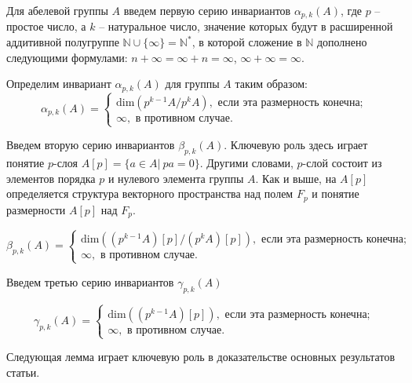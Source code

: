 \documentclass[a4paper,11pt,twoside]{article}
\def\N{{\mathbb{N}}}
\begin{document}
Для абелевой группы $A$ введем первую серию инвариантов $\alpha_{p,k}(A)$, где $p$ -- простое число, а $k$ -- натуральное число, значение которых будут в расширенной аддитивной полугруппе $\N \cup \{\infty \} = \N^*$, в которой сложение в $\N$ дополнено следующими формулами: $n + \infty = \infty + n = \infty$, $\infty + \infty = \infty$.

Определим инвариант $\alpha_{p,k}(A)$ для группы $A$ таким образом:
$$\alpha_{p,k}(A) = \left\lbrace 
\begin{array}{l}  
\mathrm{dim} \left( p^{k-1}A \Big/ p^k A \right), \text{ если эта размерность конечна;} \\ 
\infty, \text{ в противном случае.}
\end{array} 
\right.$$

Введем вторую серию инвариантов $\beta_{p,k}(A)$. Ключевую роль здесь играет понятие $p$-слоя $A[p] = \{a \in A | \ pa = 0\}$. Другими словами, $p$-слой состоит из элементов порядка $p$ и нулевого элемента группы $A$. Как и выше, на $A[p]$ определяется структура векторного пространства над полем $F_p$ и понятие размерности $A[p]$ над $F_p$.

$$\beta_{p,k}(A) = \left\lbrace 
\begin{array}{l}  
\mathrm{dim} \left( (p^{k-1}A) [p] \Big/ (p^k A) [p] \right), \text{ если эта размерность конечна;} \\ 
\infty, \text{ в противном случае.}
\end{array} 
\right.$$

Введем третью серию инвариантов $\gamma_{p,k}(A)$

$$\gamma_{p,k}(A) = \left\lbrace 
\begin{array}{l}  
\mathrm{dim} \left( (p^{k-1} A) [p] \right), \text{ если эта размерность конечна;} \\ 
\infty, \text{ в противном случае.}
\end{array} 
\right.$$

Следующая лемма играет ключевую роль в доказательстве основных результатов статьи.
\end{document}
